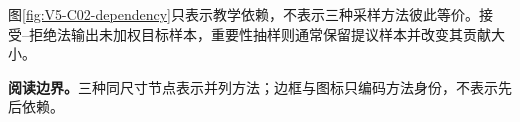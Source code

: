 \documentclass[UTF8,a4paper,11pt,openany]{ctexbook}
\begin{document}
\setcounter{page}{725}
\setcounter{chapter}{31}
\setcounter{figure}{0}
\pagestyle{headings}
图\ref{fig:V5-C02-dependency}只表示教学依赖，不表示三种采样方法彼此等价。接受--拒绝法输出未加权目标样本，重要性抽样则通常保留提议样本并改变其贡献大小。

\textbf{阅读边界。}三种同尺寸节点表示并列方法；边框与图标只编码方法身份，不表示先后依赖。
\end{document}

